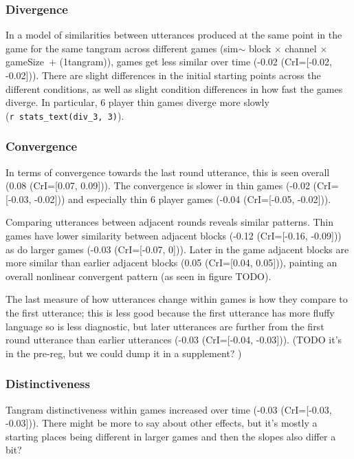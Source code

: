\documentclass[
  english,
  a4paper,
]{article}
\begin{document}
\hypertarget{divergence-2}{%
\subsubsection{Divergence}\label{divergence-2}}

In a model of similarities between utterances produced at the same point in the game for the same tangram across different games (sim\(\sim\) block \(\times\) channel \(\times\) gameSize~+ (1\textbar tangram)), games get less similar over time (-0.02 (CrI={[}-0.02, -0.02{]})). There are slight differences in the initial starting points across the different conditions, as well as slight condition differences in how fast the games diverge. In particular, 6 player thin games diverge more slowly (\texttt{r\ stats\_text(div\_3,\ 3)}).

\hypertarget{convergence-2}{%
\subsubsection{Convergence}\label{convergence-2}}

In terms of convergence towards the last round utterance, this is seen overall (0.08 (CrI={[}0.07, 0.09{]})). The convergence is slower in thin games (-0.02 (CrI={[}-0.03, -0.02{]})) and especially thin 6 player games (-0.04 (CrI={[}-0.05, -0.02{]})).

Comparing utterances between adjacent rounds reveals similar patterns. Thin games have lower similarity between adjacent blocks (-0.12 (CrI={[}-0.16, -0.09{]})) as do larger games (-0.03 (CrI={[}-0.07, 0{]})). Later in the game adjacent blocks are more similar than earlier adjacent blocks (0.05 (CrI={[}0.04, 0.05{]})), painting an overall nonlinear convergent pattern (as seen in figure TODO).

The last measure of how utterances change within games is how they compare to the first utterance; this is less good because the first utterance has more fluffy language so is less diagnostic, but later utterances are further from the first round utterance than earlier utterances (-0.03 (CrI={[}-0.04, -0.03{]})). (TODO it's in the pre-reg, but we could dump it in a supplement? )

\hypertarget{distinctiveness}{%
\subsubsection{Distinctiveness}\label{distinctiveness}}

Tangram distinctiveness within games increased over time (-0.03 (CrI={[}-0.03, -0.03{]})). There might be more to say about other effects, but it's mostly a starting places being different in larger games and then the slopes also differ a bit?
\end{document}
